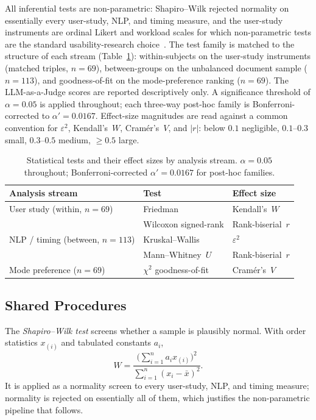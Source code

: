 All inferential tests are non-parametric: Shapiro--Wilk rejected normality on essentially every user-study, NLP, and timing measure, and the user-study instruments are ordinal Likert and workload scales for which non-parametric tests are the standard usability-research choice~\cite{SauroLewis2016}. The test family is matched to the structure of each stream (Table~\ref{tab:stat-tests-overview}): within-subjects on the user-study instruments (matched triples, $n = 69$), between-groups on the unbalanced document sample ($n = 113$), and goodness-of-fit on the mode-preference ranking ($n = 69$). The LLM-as-a-Judge scores are reported descriptively only. A significance threshold of $\alpha = 0.05$ is applied throughout; each three-way post-hoc family is Bonferroni-corrected to $\alpha' = 0.0167$. Effect-size magnitudes are read against a common convention for $\varepsilon^2$, Kendall's~$W$, Cram\'{e}r's~$V$, and $|r|$: below $0.1$ negligible, $0.1$--$0.3$ small, $0.3$--$0.5$ medium, $\geq 0.5$ large.

\begin{table}[htbp]
\centering
\caption{Statistical tests and their effect sizes by analysis
stream. $\alpha = 0.05$ throughout; Bonferroni-corrected
$\alpha' = 0.0167$ for post-hoc families.}
\label{tab:stat-tests-overview}
\begin{tabular}{@{}l l l@{}}
\toprule
Analysis stream & Test & Effect size \\
\midrule
User study (within, $n = 69$)   & Friedman              & Kendall's~$W$ \\
                            & Wilcoxon signed-rank  & Rank-biserial~$r$ \\
NLP / timing (between, $n = 113$) & Kruskal--Wallis & $\varepsilon^2$ \\
                            & Mann--Whitney~$U$     & Rank-biserial~$r$ \\
Mode preference ($n = 69$)  & $\chi^2$ goodness-of-fit & Cram\'{e}r's~$V$ \\
\bottomrule
\end{tabular}
\end{table}

\subsection{Shared Procedures}

The \emph{Shapiro--Wilk test} screens whether a sample is plausibly normal. With order statistics $x_{(i)}$ and tabulated constants $a_i$,
\begin{equation}
W = \frac{\bigl( \sum_{i=1}^{n} a_i x_{(i)} \bigr)^2}{\sum_{i=1}^{n} (x_i - \bar{x})^2}.
\end{equation}
It is applied as a normality screen to every user-study, NLP, and timing measure; normality is rejected on essentially all of them, which justifies the non-parametric pipeline that follows.

